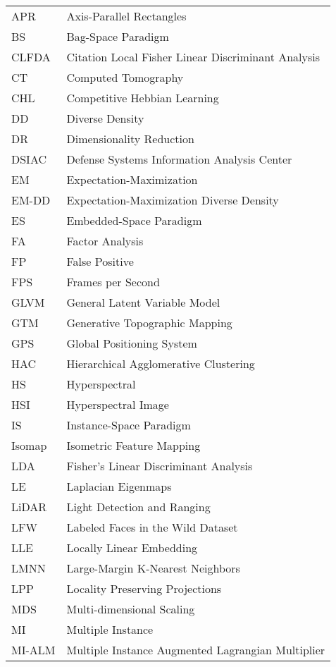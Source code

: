 \begin{tabular}{l p{5in}} %

APR & Axis-Parallel Rectangles\\
BS & Bag-Space Paradigm\\
CLFDA &  Citation Local Fisher Linear Discriminant Analysis\\
CT & Computed Tomography\\
CHL & Competitive Hebbian Learning\\
DD & Diverse Density\\
DR & Dimensionality Reduction\\
DSIAC & Defense Systems Information Analysis Center\\
EM & Expectation-Maximization\\
EM-DD & Expectation-Maximization Diverse Density\\
ES & Embedded-Space Paradigm\\
FA & Factor Analysis\\
FP & False Positive\\ 
FPS & Frames per Second\\
GLVM & General Latent Variable Model\\
GTM & Generative Topographic Mapping\\
GPS & Global Positioning System\\
HAC & Hierarchical Agglomerative Clustering\\
HS & Hyperspectral\\
HSI & Hyperspectral Image\\
IS & Instance-Space Paradigm\\
Isomap & Isometric Feature Mapping\\
LDA & Fisher's Linear Discriminant Analysis\\
LE & Laplacian Eigenmaps\\
LiDAR & Light Detection and Ranging\\
LFW & Labeled Faces in the Wild Dataset\\
LLE & Locally Linear Embedding\\
LMNN & Large-Margin K-Nearest Neighbors\\
LPP & Locality Preserving Projections\\
MDS & Multi-dimensional Scaling\\
MI & Multiple Instance\\
MI-ALM & Multiple Instance Augmented Lagrangian Multiplier\\

\end{tabular}
